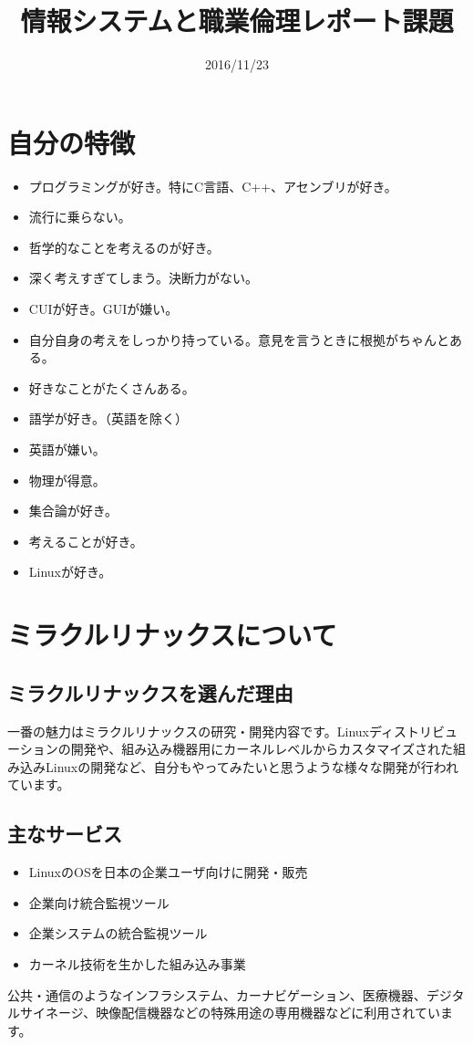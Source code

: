 \documentclass[a4paper]{jsarticle}
\title{情報システムと職業倫理レポート課題}
\date{2016/11/23}
\begin{document}
\maketitle
\section{自分の特徴}
\begin{itemize}
	\item プログラミングが好き。特にC言語、C++、アセンブリが好き。
	\item 流行に乗らない。
	\item 哲学的なことを考えるのが好き。
	\item 深く考えすぎてしまう。決断力がない。
	\item CUIが好き。GUIが嫌い。
	\item 自分自身の考えをしっかり持っている。意見を言うときに根拠がちゃんとある。
	\item 好きなことがたくさんある。
	\item 語学が好き。（英語を除く）
	\item 英語が嫌い。
	\item 物理が得意。
	\item 集合論が好き。
	\item 考えることが好き。
	\item Linuxが好き。
\end{itemize}
\section{ミラクルリナックスについて}
\subsection{ミラクルリナックスを選んだ理由}
一番の魅力はミラクルリナックスの研究・開発内容です。Linuxディストリビューションの開発や、組み込み機器用にカーネルレベルからカスタマイズされた組み込みLinuxの開発など、自分もやってみたいと思うような様々な開発が行われています。
\subsection{主なサービス}
\begin{itemize}
	\item LinuxのOSを日本の企業ユーザ向けに開発・販売
	\item 企業向け統合監視ツール
	\item 企業システムの統合監視ツール
	\item カーネル技術を生かした組み込み事業
\end{itemize}
公共・通信のようなインフラシステム、カーナビゲーション、医療機器、デジタルサイネージ、映像配信機器などの特殊用途の専用機器などに利用されています。
\end{document}
